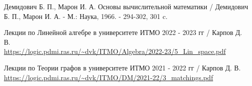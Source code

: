 \documentclass{article}
\begin{document}
\begin{thebibliography}{9}

    Демидович Б. П., Марон И. А.
    Основы вычислительной математики /
    Демидович Б. П., Марон И. А. -
    М.: Наука, 1966. -
    294-302, 301 c.


    Лекции по Линейной алгебре в университете ИТМО 
    2022 - 2023 гг / Карпов Д. В. \\
    \url{https://logic.pdmi.ras.ru/~dvk/ITMO/Algebra/2022-23/5_Lin_space.pdf}

    Лекции по Теории графов в университете ИТМО
    2021 - 2022 гг / Карпов Д. В. \\
    \url{https://logic.pdmi.ras.ru/~dvk/ITMO/DM/2021-22/3_matchings.pdf}
    
\end{thebibliography}
\end{document}
